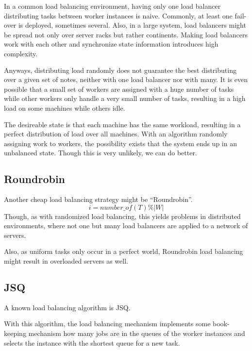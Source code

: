 In a common load balancing environment, having only one load balancer
distributing tasks between worker instances is naive.
Commonly, at least one fail-over is deployed, sometimes several.
Also, in a large system, load balancers might be spread not only over server
racks but rather continents.
Making load balancers work with each other and synchronize state information
introduces high complexity.

Anyways, distributing load randomly does not guarantee the best distributing
over a given set of notes, neither with one load balancer nor with many.
It is even possible that a small set of workers are assigned
with a huge number of tasks while other workers only handle a very small number
of tasks, resulting in a high load on some machines while others idle.

The desireable state is that each machine has the same workload, resulting in a
perfect distribution of load over all machines.
With an algorithm randomly assigning work to workers, the possibility exists
that the system ends up in an unbalanced state.
Though this is very unlikely, we can do better.

\subsection{Roundrobin}

Another cheap load balancing strategy might be ``Roundrobin''.
\begin{equation}
    i = number\_of(T) \% |W|
\end{equation}
Though, as with randomized load balancing, this yields problems in distributed
environments, where not one but many load balancers are applied to a network of
servers.

Also, as uniform tasks only occur in a perfect world, Roundrobin load balancing
might result in overloaded servers as well.

\subsection{\ac{JSQ}}

A known load balancing algorithm is \ac{JSQ}.

With this algorithm, the load balancing mechanism implements some book-keeping
mechanism how many jobs are in the queues of the worker instances and selects
the instance with the shortest queue for a new task.

